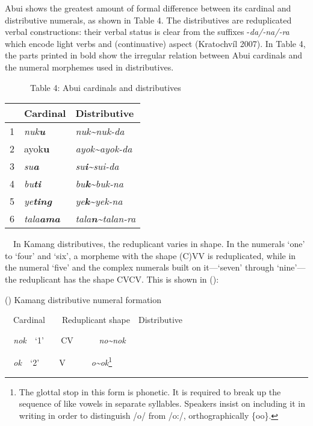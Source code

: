 Abui shows the greatest amount of formal difference between its cardinal and distributive numerals, as shown in Table 4. The distributives are reduplicated verbal constructions: their verbal status is clear from the suffixes -\textit{da/-na/-ra }which encode light verbs and (continuative) aspect (Kratochv\'il 2007). In Table 4, the parts printed in bold show the irregular relation between Abui cardinals and the numeral morphemes used in distributives.

\ \ \ \ \ \ Table 4: Abui cardinals and distributives

\begin{center}
\tablehead{}
\begin{supertabular}{m{0.48725984in}m{0.9670598in}m{1.6712599in}}
\hline
 &
Cardinal  &
Distributive\\ &
\textit{nuk}\textbf{\textit{u}} &
\textit{nuk\~{}nuk-da}\\
2 &
ayok\textbf{u} &
\textit{ayok\~{}ayok-da }\\
3 &
\textit{su}\textbf{\textit{a}} &
\textit{su}\textbf{\textit{i}}\textit{\~{}sui-da}\\
4 &
\textit{bu}\textbf{\textit{ti}} &
\textit{bu}\textbf{\textit{k}}\textit{\~{}buk-na}\\
5 &
\textit{ye}\textbf{\textit{ting}} &
\textit{ye}\textbf{\textit{k}}\textit{\~{}yek-na}\\
6 &
\textit{tala}\textbf{\textit{ama}} &
\textit{tala}\textbf{\textit{n}}\textit{\~{}talan-ra}\\
\end{supertabular}
\end{center}
\ \ In Kamang distributives, the reduplicant varies in shape. In the numerals {\textquoteleft}one{\textquoteright} to {\textquoteleft}four{\textquoteright} and {\textquoteleft}six{\textquoteright}, a morpheme with the shape (C)VV is reduplicated, while in the numeral {\textquoteleft}five{\textquoteright} and the complex numerals built on it---{\textquoteleft}seven{\textquoteright} through {\textquoteleft}nine{\textquoteright}---the reduplicant has the shape CVCV. This is shown in ():

\label{bkm:Ref342656818}() Kamang distributive numeral formation

\ \ Cardinal\ \ \ \ Reduplicant shape\ \ Distributive 

\textit{\ \ nok\ \ }{\textquoteleft}1{\textquoteright}\ \ \textit{\ \ }CV\ \ \textit{\ \ \ \ no\~{}nok}

\textit{\ \ ok\ \ }{\textquoteleft}2{\textquoteright}\textit{ \ \ \ \ }V\textit{\ \ \ \ \ \ o}\textit{{\textglotstop}}\textit{\~{}ok}\footnote{ The glottal stop in this form is phonetic. It is required to break up the sequence of like vowels in separate syllables. Speakers insist on including it in writing in order to distinguish /o/ from /o:/, orthographically \{oo\}. }

